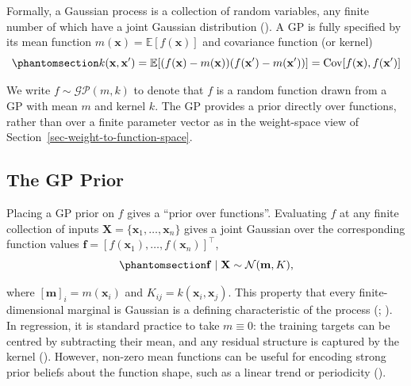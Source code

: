 \documentclass[
  letterpaper,
  DIV=11,
  numbers=noendperiod]{scrartcl}
\begin{document}
Formally, a Gaussian process is a collection of random variables, any
finite number of which have a joint Gaussian distribution
(). A
GP is fully specified by its mean function
\(m(\mathbf{x}) = \mathbb{E}[f(\mathbf{x})]\) and covariance function
(or kernel) \begin{equation}\phantomsection\label{eq-kernel-covariance}{
k(\mathbf{x}, \mathbf{x}') = \mathbb{E}[(f(\mathbf{x}) - m(\mathbf{x}))(f(\mathbf{x}') - m(\mathbf{x}'))] = \operatorname{Cov}[f(\mathbf{x}), f(\mathbf{x}')]
}\end{equation}

We write \(f \sim \mathcal{GP}(m, k)\) to denote that \(f\) is a random
function drawn from a GP with mean \(m\) and kernel \(k\). The GP
provides a prior directly over functions, rather than over a finite
parameter vector as in the weight-space view of
Section~\ref{sec-weight-to-function-space}.

\subsection{The GP Prior}\label{sec-gp-prior}

Placing a GP prior on \(f\) gives a ``prior over functions''. Evaluating
\(f\) at any finite collection of inputs
\(\mathbf{X} = \{\mathbf{x}_1, \ldots, \mathbf{x}_n\}\) gives a joint
Gaussian over the corresponding function values
\(\mathbf{f} = [f(\mathbf{x}_1), \ldots, f(\mathbf{x}_n)]^\top\),
\begin{equation}\phantomsection\label{eq-gp-prior}{
\mathbf{f} \mid \mathbf{X} \sim \mathcal{N}(\mathbf{m}, K),
}\end{equation}

where \([\mathbf{m}]_i = m(\mathbf{x}_i)\) and
\(K_{ij} = k(\mathbf{x}_i, \mathbf{x}_j)\). This property that every
finite-dimensional marginal is Gaussian is a defining characteristic of
the process (; ). In regression, it is standard practice to take
\(m \equiv 0\): the training targets can be centred by subtracting their
mean, and any residual structure is captured by the kernel
(). However,
non-zero mean functions can be useful for encoding strong prior beliefs
about the function shape, such as a linear trend or periodicity
().
\end{document}
